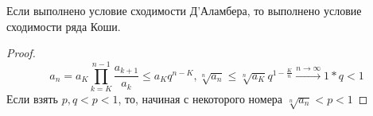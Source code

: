 \newpage	
\begin{thm}
Если выполнено условие сходимости Д'Аламбера, то выполнено условие сходимости ряда Коши.
\end{thm}
\begin{proof}
$$a_n = a_K \prod_{k=K}^{n-1} \frac{a_{k+1}}{a_k} \le a_K q^{n-K}, \sqrt[n]{a_n} \le \sqrt[n]{a_K}q^{1-\frac{K}{n}} \xrightarrow{n \to \infty} 1*q < 1$$
Если взять $p, q<p<1$, то, начиная с некоторого номера $\sqrt[n]{a_n}<p<1$
\end{proof}

